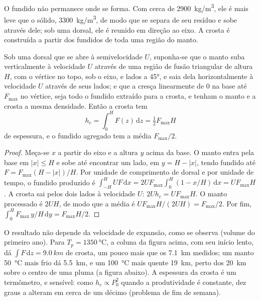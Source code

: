 O fundido não permanece onde se forma. Com cerca de \qty{2900}{kg/m^3}, ele é
mais leve que o  sólido, \qty{3300}{kg/m^3}, de modo que se separa de seu
resíduo e sobe através dele; sob uma dorsal, ele é reunido em direção ao eixo.
A crosta é construída a partir dos fundidos de toda uma região do manto.

\begin{proposition}\label{prop:b2:mantle-melting:triangle}
Sob uma dorsal que se abre à semivelocidade $U$, suponha-se que o manto suba verticalmente à
velocidade $U$ através de uma região de fusão triangular de altura $H$, com o vértice no topo,
sob o eixo, e lados a \ang{45}, e saia dela horizontalmente à velocidade $U$
através de seus lados; e que a  cresça linearmente de $0$ na base até
$F_{\max}$ no vértice, seja todo o fundido extraído para a crosta, e tenham o manto e a
crosta a mesma densidade. Então a crosta tem
\[
  h_c = \int_0^H F(z)\,\mathrm dz = \tfrac12 F_{\max}H
\]
de espessura, e o fundido agregado tem a  média $F_{\max}/2$.
\end{proposition}

\begin{proof}
Meça-se $x$ a partir do eixo e a altura $y$ acima da base. O manto entra pela base
em $|x| \le H$ e sobe até encontrar um lado, em $y = H - |x|$, tendo fundido até
$F = F_{\max}(H - |x|)/H$. Por unidade de comprimento de dorsal e por unidade de tempo, o fundido produzido é
$\int_{-H}^{H} U F\,\mathrm dx = 2UF_{\max}\int_0^H (1 - x/H)\,\mathrm dx =
UF_{\max}H$. A crosta sai pelos dois lados à velocidade $U$: $2Uh_c = UF_{\max}H$.
O manto processado é $2UH$, de modo que a  média é $UF_{\max}H/(2UH) =
F_{\max}/2$. Por fim, $\int_0^H F_{\max}\,y/H\,\mathrm dy = F_{\max}H/2$.
\end{proof}

O resultado não depende da velocidade de expansão, como se observa (volume do primeiro
ano). Para $T_p = \qty{1350}{\celsius}$, a coluna da figura acima, com seu
início lento, dá $\int F\,\mathrm dz = \qty{9.0}{km}$ de crosta, um pouco mais
que os \qty{7.1}{km} medidos; um manto \qty{50}{\celsius} mais frio dá
\qty{5.5}{km}, e um \qty{100}{\celsius} mais quente \qty{19}{km}, perto dos
\qty{20}{km} sobre o centro de uma pluma (a figura abaixo). A espessura da crosta é um
termômetro, e sensível: como $h_c \propto P_0^2$ quando a produtividade é
constante, dez graus a alteram em cerca de um décimo (problema de fim de semana).

